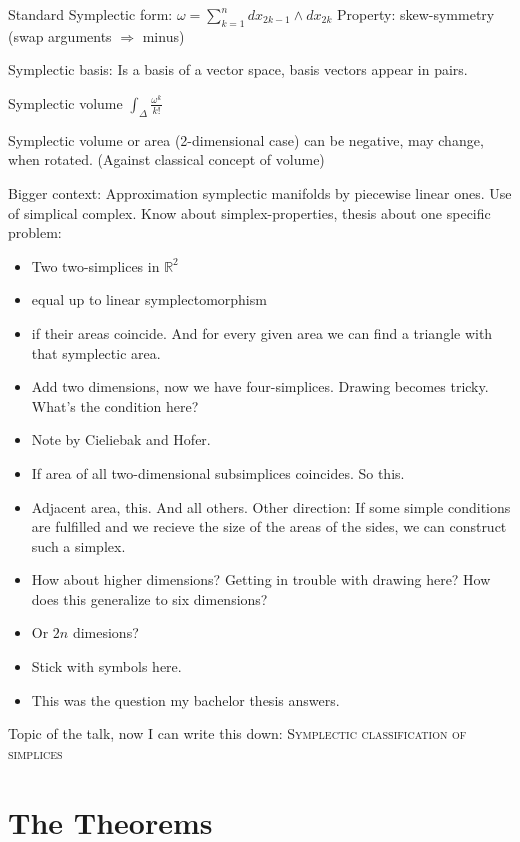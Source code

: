 \documentclass[12pt,a4paper]{scrartcl}
\begin{document}
Standard Symplectic form: \( \omega = \sum\limits_{k=1}^{n} dx_{2k-1} \wedge dx_{2k} \)
Property: skew-symmetry (swap arguments \( \Rightarrow \) minus)

Symplectic basis: Is a basis of a vector space, basis vectors appear in pairs.

Symplectic volume \( \int_{\Delta} \frac{\omega^k}{k!} \)

Symplectic volume or area (2-dimensional case) can be negative, may change, when rotated. (Against classical concept of volume)


Bigger context: Approximation symplectic manifolds by piecewise linear ones. Use of simplical complex. Know about simplex-properties, thesis about one specific problem:

\begin{itemize}
  \item Two two-simplices in \( \mathbb{R}^2 \) 
  \item equal up to linear symplectomorphism
  \item if their areas coincide. And for every given area we can find a triangle with that symplectic area.
  \item Add two dimensions, now we have four-simplices. Drawing becomes tricky. What's the condition here?
  \item Note by Cieliebak and Hofer.
  \item If area of all two-dimensional subsimplices coincides. So this.
  \item Adjacent area, this. And all others. Other direction: If some simple conditions are fulfilled and we recieve the size of the areas of the sides, we can construct such a simplex.
  \item How about higher dimensions? Getting in trouble with drawing here? How does this generalize to six dimensions?
  \item Or \( 2n \) dimesions?
  \item Stick with symbols here.
  \item This was the question my bachelor thesis answers.
\end{itemize}

Topic of the talk, now I can write this down: \textsc{Symplectic classification of simplices}


\section{The Theorems}
\end{document}
